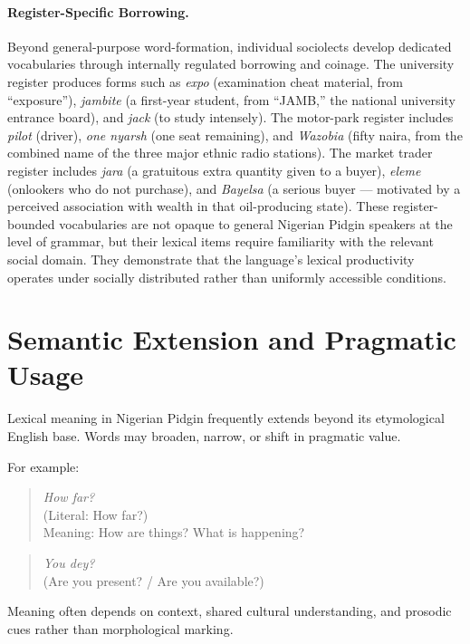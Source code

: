 \documentclass[12pt]{article}
\begin{document}
\paragraph{Register-Specific Borrowing.}
Beyond general-purpose word-formation, individual sociolects develop dedicated vocabularies through internally regulated borrowing and coinage. The university register produces forms such as \textit{expo} (examination cheat material, from ``exposure''), \textit{jambite} (a first-year student, from ``JAMB,'' the national university entrance board), and \textit{jack} (to study intensely). The motor-park register includes \textit{pilot} (driver), \textit{one nyarsh} (one seat remaining), and \textit{Wazobia} (fifty naira, from the combined name of the three major ethnic radio stations). The market trader register includes \textit{jara} (a gratuitous extra quantity given to a buyer), \textit{eleme} (onlookers who do not purchase), and \textit{Bayelsa} (a serious buyer --- motivated by a perceived association with wealth in that oil-producing state). These register-bounded vocabularies are not opaque to general Nigerian Pidgin speakers at the level of grammar, but their lexical items require familiarity with the relevant social domain. They demonstrate that the language's lexical productivity operates under socially distributed rather than uniformly accessible conditions.

\section{Semantic Extension and Pragmatic Usage}

Lexical meaning in Nigerian Pidgin frequently extends beyond its etymological English base. Words may broaden, narrow, or shift in pragmatic value.

For example:

\begin{quote}
\textit{How far?} \\
(Literal: How far?) \\
Meaning: How are things? What is happening?
\end{quote}

\begin{quote}
\textit{You dey?} \\
(Are you present? / Are you available?)
\end{quote}

Meaning often depends on context, shared cultural understanding, and prosodic cues rather than morphological marking.
\end{document}

